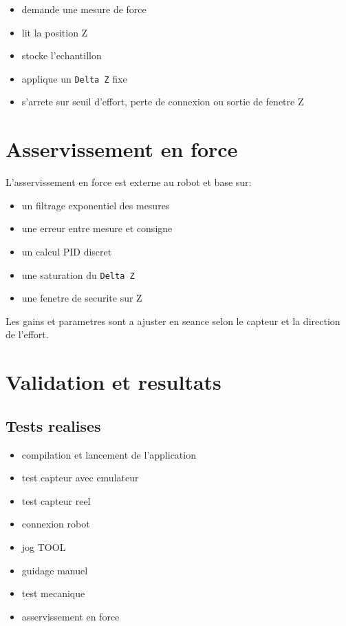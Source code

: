 \documentclass[11pt,a4paper]{article}
\begin{document}
\begin{itemize}
    \item demande une mesure de force
    \item lit la position Z
    \item stocke l'echantillon
    \item applique un \texttt{Delta Z} fixe
    \item s'arrete sur seuil d'effort, perte de connexion ou sortie de fenetre Z
\end{itemize}

\section{Asservissement en force}

L'asservissement en force est externe au robot et base sur:

\begin{itemize}
    \item un filtrage exponentiel des mesures
    \item une erreur entre mesure et consigne
    \item un calcul PID discret
    \item une saturation du \texttt{Delta Z}
    \item une fenetre de securite sur Z
\end{itemize}

Les gains et parametres sont a ajuster en seance selon le capteur et la direction de l'effort.

\section{Validation et resultats}

\subsection{Tests realises}

\begin{itemize}
    \item compilation et lancement de l'application
    \item test capteur avec emulateur
    \item test capteur reel
    \item connexion robot
    \item jog TOOL
    \item guidage manuel
    \item test mecanique
    \item asservissement en force
\end{itemize}
\end{document}
